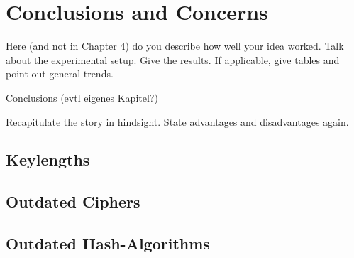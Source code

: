 \chapter{Conclusions and Concerns}

Here (and not in Chapter 4) do you describe how well your idea
worked. Talk about the experimental setup. Give the results. If
applicable, give tables and point out general trends.

Conclusions (evtl eigenes Kapitel?)

Recapitulate the story in hindsight. State advantages and
disadvantages again.

\section{Keylengths}

\section{Outdated Ciphers}

\section{Outdated Hash-Algorithms}

